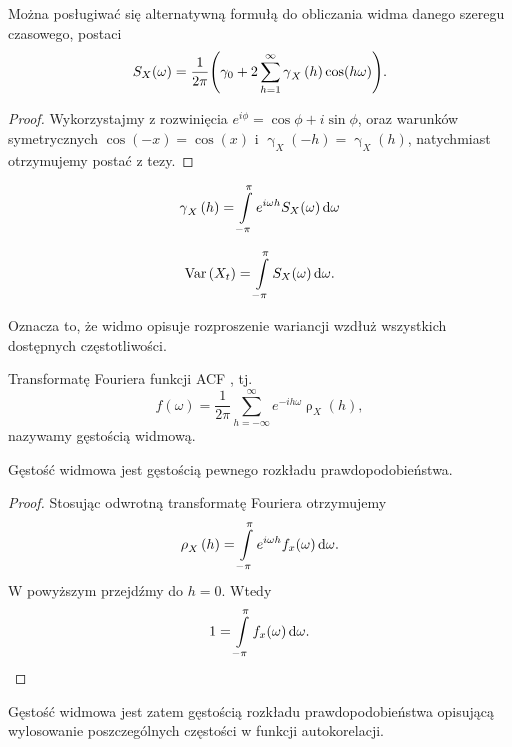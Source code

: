 \documentclass[10pt,a4paper]{book}
\newcommand{\tsAutoCovariance}[3][\gamma]{\operatorname{#1}_{#2} \left({#3}\right)}
\newcommand{\tsAutoCorellation}[3][\rho]{\operatorname{#1}_{#2} \left({#3}\right)}
\begin{document}
\begin{corollary}
Można posługiwać się alternatywną formułą do obliczania widma danego szeregu czasowego, postaci
$$
S_X(\omega) = \frac{1}{2\pi} \bracket{\gamma_0 + 2 \sum_{h=1}^{\infty} \tsAutoCovariance{X}{h} \cos(h\omega)}.
$$
\end{corollary}

\begin{proof}
Wykorzystajmy z rozwinięcia $e^{i\phi} = \cos \phi + i \sin \phi$, oraz warunków symetrycznych $\cos(-x) = \cos(x)$ i $\tsAutoCovariance{X}{-h} = \tsAutoCovariance{X}{h}$, natychmiast otrzymujemy postać z tezy.
\end{proof}

\begin{corollary}
$$
\tsAutoCovariance{X}{h} = \int_{-\pi}^{\pi} e^{i\omega h} S_X(\omega) \dt[\omega] 
$$
\end{corollary}

\begin{corollary}
$$
\Variance{X_t} = \int_{-\pi }^{\pi} S_X(\omega) \dt[\omega].
$$
\end{corollary}

Oznacza to, że widmo opisuje rozproszenie wariancji wzdłuż wszystkich dostępnych częstotliwości.

\begin{definition}
Transformatę Fouriera funkcji ACF , tj. 
$$
f(\omega) = \frac{1}{2\pi} \sum_{h=-\infty}^{\infty} e^{-i h \omega} \tsAutoCorellation{X}{h},
$$
nazywamy gęstością widmową.
\end{definition}

\begin{theorem}
Gęstość widmowa jest gęstością pewnego rozkładu prawdopodobieństwa.
\end{theorem}

\begin{proof}
Stosując odwrotną transformatę Fouriera otrzymujemy
$$
\tsAutoCorellation{X}{h}= \int_{-\pi}^{\pi} e^{i \omega h} f_x(\omega) \dt[\omega].
$$
W powyższym przejdźmy do $h=0$. Wtedy
$$
1= \int_{-\pi}^{\pi} f_x(\omega) \dt[\omega].
$$
\end{proof}

Gęstość widmowa jest zatem gęstością rozkładu prawdopodobieństwa opisującą wylosowanie poszczególnych częstości w funkcji autokorelacji. 
\end{document}
